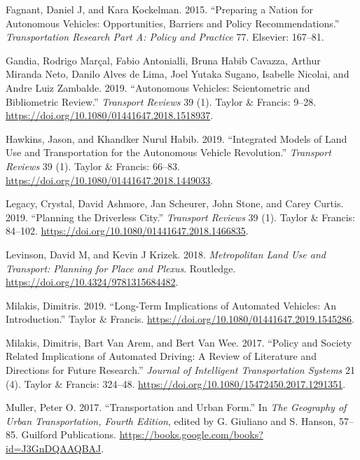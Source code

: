 \documentclass[12pt,]{article}
\begin{document}
\leavevmode\hypertarget{ref-fagnant2015preparing}{}%
Fagnant, Daniel J, and Kara Kockelman. 2015. ``Preparing a Nation for
Autonomous Vehicles: Opportunities, Barriers and Policy
Recommendations.'' \emph{Transportation Research Part A: Policy and
Practice} 77. Elsevier: 167--81.

\leavevmode\hypertarget{ref-gandia2019autonomous}{}%
Gandia, Rodrigo Marçal, Fabio Antonialli, Bruna Habib Cavazza, Arthur
Miranda Neto, Danilo Alves de Lima, Joel Yutaka Sugano, Isabelle
Nicolai, and Andre Luiz Zambalde. 2019. ``Autonomous Vehicles:
Scientometric and Bibliometric Review.'' \emph{Transport Reviews} 39
(1). Taylor \& Francis: 9--28.
\url{https://doi.org/10.1080/01441647.2018.1518937}.

\leavevmode\hypertarget{ref-hawkins2019integrated}{}%
Hawkins, Jason, and Khandker Nurul Habib. 2019. ``Integrated Models of
Land Use and Transportation for the Autonomous Vehicle Revolution.''
\emph{Transport Reviews} 39 (1). Taylor \& Francis: 66--83.
\url{https://doi.org/10.1080/01441647.2018.1449033}.

\leavevmode\hypertarget{ref-legacy2019planning}{}%
Legacy, Crystal, David Ashmore, Jan Scheurer, John Stone, and Carey
Curtis. 2019. ``Planning the Driverless City.'' \emph{Transport Reviews}
39 (1). Taylor \& Francis: 84--102.
\url{https://doi.org/10.1080/01441647.2018.1466835}.

\leavevmode\hypertarget{ref-levinson2018metropolitan}{}%
Levinson, David M, and Kevin J Krizek. 2018. \emph{Metropolitan Land Use
and Transport: Planning for Place and Plexus}. Routledge.
\url{https://doi.org/10.4324/9781315684482}.

\leavevmode\hypertarget{ref-milakis2019long}{}%
Milakis, Dimitris. 2019. ``Long-Term Implications of Automated Vehicles:
An Introduction.'' Taylor \& Francis.
\url{https://doi.org/10.1080/01441647.2019.1545286}.

\leavevmode\hypertarget{ref-milakis2017policy}{}%
Milakis, Dimitris, Bart Van Arem, and Bert Van Wee. 2017. ``Policy and
Society Related Implications of Automated Driving: A Review of
Literature and Directions for Future Research.'' \emph{Journal of
Intelligent Transportation Systems} 21 (4). Taylor \& Francis: 324--48.
\url{https://doi.org/10.1080/15472450.2017.1291351}.

\leavevmode\hypertarget{ref-Muller2017transportation}{}%
Muller, Peter O. 2017. ``Transportation and Urban Form.'' In \emph{The
Geography of Urban Transportation, Fourth Edition}, edited by G.
Giuliano and S. Hanson, 57--85. Guilford Publications.
\url{https://books.google.com/books?id=J3GnDQAAQBAJ}.
\end{document}
